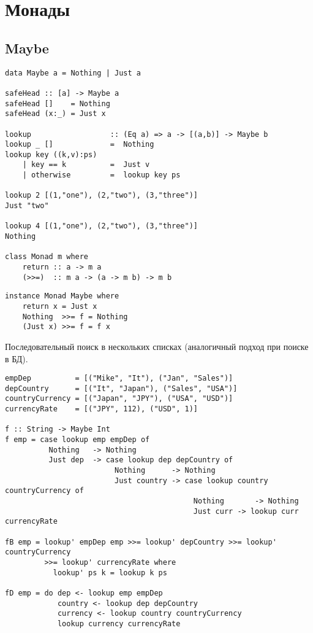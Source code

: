 \documentclass[a4paper,10pt]{article}
\begin{document}
\section{Монады}
\subsection{Maybe}
\begin{lstlisting}
data Maybe a = Nothing | Just a

safeHead :: [a] -> Maybe a
safeHead []    = Nothing
safeHead (x:_) = Just x

lookup                  :: (Eq a) => a -> [(a,b)] -> Maybe b
lookup _ []             =  Nothing
lookup key ((k,v):ps)
    | key == k          =  Just v
    | otherwise         =  lookup key ps

lookup 2 [(1,"one"), (2,"two"), (3,"three")]
Just "two"

lookup 4 [(1,"one"), (2,"two"), (3,"three")]
Nothing

class Monad m where
    return :: a -> m a
    (>>=)  :: m a -> (a -> m b) -> m b
\end{lstlisting}

\clearpage

\begin{lstlisting}
instance Monad Maybe where
    return x = Just x
    Nothing  >>= f = Nothing
    (Just x) >>= f = f x
\end{lstlisting}

Последовательный поиск в нескольких списках (аналогичный подход при поиске в БД).
\begin{lstlisting}
empDep          = [("Mike", "It"), ("Jan", "Sales")]
depCountry      = [("It", "Japan"), ("Sales", "USA")]
countryCurrency = [("Japan", "JPY"), ("USA", "USD")]
currencyRate    = [("JPY", 112), ("USD", 1)]

f :: String -> Maybe Int
f emp = case lookup emp empDep of
          Nothing   -> Nothing
          Just dep  -> case lookup dep depCountry of
                         Nothing      -> Nothing
                         Just country -> case lookup country countryCurrency of
                                           Nothing       -> Nothing
                                           Just curr -> lookup curr currencyRate

fB emp = lookup' empDep emp >>= lookup' depCountry >>= lookup' countryCurrency
         >>= lookup' currencyRate where
           lookup' ps k = lookup k ps

fD emp = do dep <- lookup emp empDep
            country <- lookup dep depCountry
            currency <- lookup country countryCurrency
            lookup currency currencyRate
\end{lstlisting}
\end{document}
